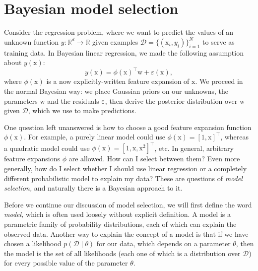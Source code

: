 \documentclass{article}
\newcommand{\given}{\mid}
\newcommand{\mc}[1]{\mathcal{#1}}
\newcommand{\data}{\mc{D}}
\newcommand{\trans}{^\top}
\renewcommand{\vec}[1]{\bm{\mathrm{#1}}}
\newcommand{\R}{\mathbb{R}}
\renewcommand{\epsilon}{\varepsilon}
\begin{document}
\section*{Bayesian model selection}

Consider the regression problem, where we want to predict the values
of an unknown function $y\colon \R^d \to \R$ given examples $\data =
\bigl\{ (\vec{x}_i, y_i) \bigr\}_{i = 1}^N$ to serve as training data.
In Bayesian linear regression, we made the following assumption about
$y(\vec{x})$:
\begin{equation}
  y(\vec{x}) = \phi(\vec{x})\trans \vec{w} + \epsilon(\vec{x}),
\end{equation}
where $\phi(\vec{x})$ is a now explicitly-written feature expansion of
$\vec{x}$.  We proceed in the normal Bayesian way: we place Gaussian
priors on our unknowns, the parameters $\vec{w}$ and the residuals
$\vec{\epsilon}$, then derive the posterior distribution over
$\vec{w}$ given $\data$, which we use to make predictions.

One question left unanswered is how to choose a good feature expansion
function $\phi(\vec{x})$.  For example, a purely linear model could
use $\phi(\vec{x}) = [1, \vec{x}]\trans$, whereas a quadratic model
could use $\phi(\vec{x}) = [1, \vec{x}, \vec{x}^2]\trans$, etc.  In
general, arbitrary feature expansions $\phi$ are allowed.  How can I
select between them?  Even more generally, how do I select whether I
should use linear regression or a completely different probabilistic
model to explain my data?  These are questions of \emph{model
  selection,} and naturally there is a Bayesian approach to it.

Before we continue our discussion of model selection, we will first
define the word \emph{model,} which is often used loosely without
explicit definition.  A model is a parametric family of probability
distributions, each of which can explain the observed data.  Another
way to explain the concept of a model is that if we have chosen a
likelihood $p(\data \given \theta)$ for our data, which depends on a
parameter $\theta$, then the model is the set of all likelihoods (each
one of which is a distribution over $\data$) for every possible value
of the parameter $\theta$.
\end{document}
